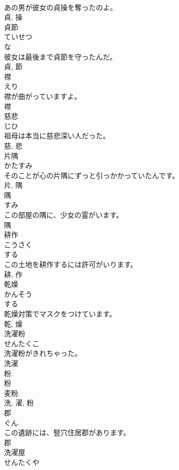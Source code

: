 \documentclass[8pt]{extreport}
\begin{document}
\begin{CJK}{UTF8}{min}
\\	あの男が彼女の貞操を奪ったのよ。	
\\	貞, 操	
\\	貞節	
\\	ていせつ	
\\	な 
\\	彼女は最後まで貞節を守ったんだ。	
\\	貞, 節	
\\	襟	
\\	えり	
\\	襟が曲がっていますよ。	
\\	襟	
\\	慈悲	
\\	じひ	
\\	祖母は本当に慈悲深い人だった。	
\\	慈, 悲	
\\	片隅	
\\	かたすみ	
\\	そのことが心の片隅にずっと引っかかっていたんです。	
\\	片, 隅	
\\	隅	
\\	すみ	
\\	この部屋の隅に、少女の霊がいます。	
\\	隅	
\\	耕作	
\\	こうさく	
\\	する 
\\	この土地を耕作するには許可がいります。	
\\	耕, 作	
\\	乾燥	
\\	かんそう	
\\	する 
\\	乾燥対策でマスクをつけています。	
\\	乾, 燥	
\\	洗濯粉	
\\	せんたくこ	
\\	洗濯粉がきれちゃった。	
\\	洗濯 
\\	粉. 
\\	粉 
\\	麦粉. 
\\	洗, 濯, 粉	
\\	郡	
\\	ぐん	
\\	この遺跡には、竪穴住居郡があります。	
\\	郡	
\\	洗濯屋	
\\	せんたくや	

\end{CJK}
\end{document}
